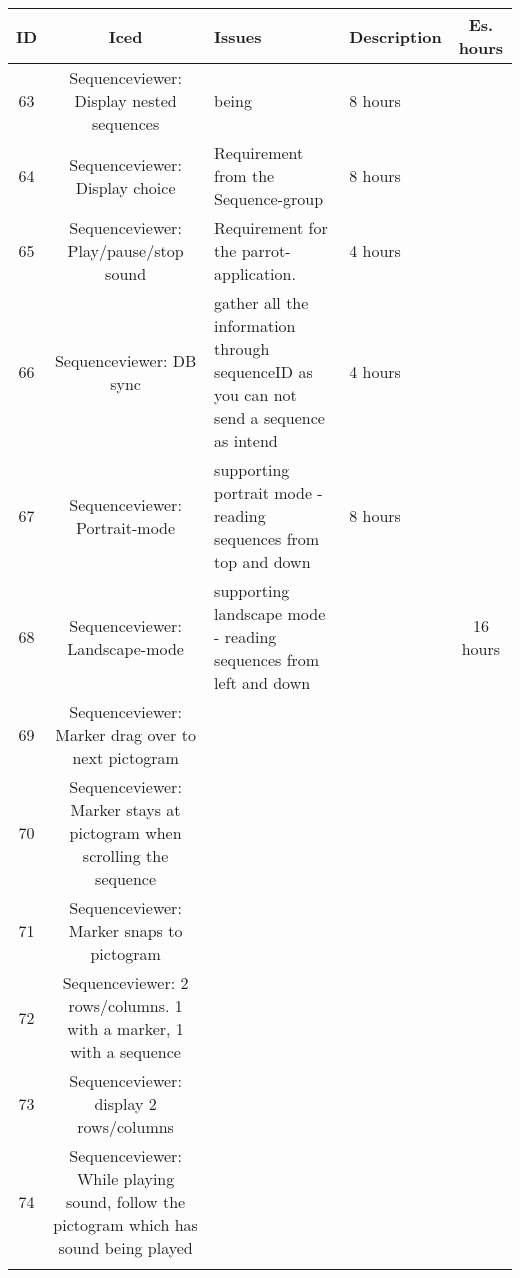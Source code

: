 \begin{longtable} { | c | c | p{5cm} | p{5cm} | c | } 
\hline
	ID 	&	Iced	&	Issues	&	Description		&	 Es. hours \\\hline
	63	& 	Sequenceviewer: Display nested sequences	&	being		& 	8 hours \\\hline
	64	&   	Sequenceviewer: Display choice	&	Requirement from the Sequence-group	& 	8 hours  \\\hline
	65	& 	Sequenceviewer: Play/pause/stop sound	&	Requirement for the parrot-application.	& 	4 hours  \\\hline
	66	& 	Sequenceviewer: DB sync	&	gather all the information through sequenceID as you can not send a sequence as intend			 &  4 hours \\\hline
	67	& 	Sequenceviewer: Portrait-mode	&	supporting portrait mode - reading sequences from top and down	 &  8 hours \\\hline
	68	& 	Sequenceviewer: Landscape-mode	&	supporting landscape mode - reading sequences from left and down		& 		 &  16 hours \\\hline
	69	& 	Sequenceviewer: Marker drag over to next pictogram	&			& 		 &  \\\hline
	70	& 	Sequenceviewer: Marker stays at pictogram when scrolling the sequence	&			& 		 &  \\\hline
	71	& 	Sequenceviewer: Marker snaps to pictogram		&			& 		 &  \\\hline
	72	& 	Sequenceviewer: 2 rows/columns. 1 with a marker, 1 with a sequence	&			& 		 &  \\\hline
	73	& 	Sequenceviewer: display 2 rows/columns	&			& 		 &  \\\hline
	74	& 	Sequenceviewer: While playing sound, follow the pictogram which has sound being played	&			& 		 &  \\\hline
\label{tab:spr3_sw_prodblog}
\end{longtable}

